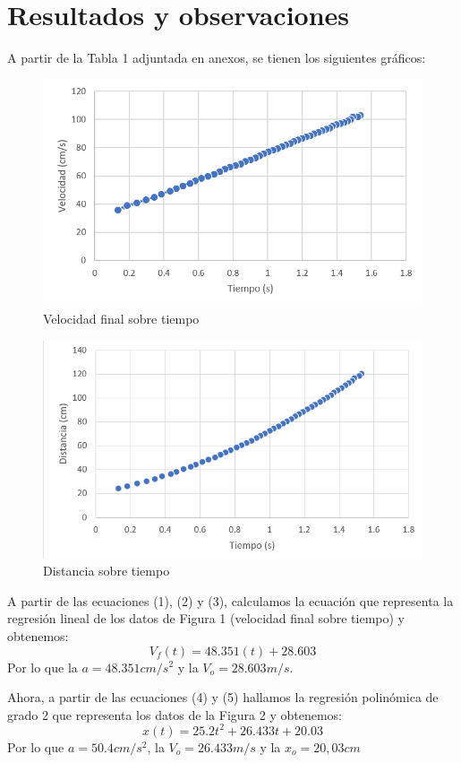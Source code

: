 \documentclass[a4paper]{article}
\begin{document}
\section{Resultados y observaciones}
A partir de la Tabla 1 adjuntada en anexos, se tienen los siguientes gráficos:
\begin{figure} [H]
    \centering
    \includegraphics{Figura_Vf_sobre_t(1).png}
    \caption{Velocidad final sobre tiempo}
    \label{fig:v_t}
\end{figure}
\begin{figure} [H]
    \centering
    \includegraphics{Figura_x_sobre_t(1).png}
    \caption{Distancia sobre tiempo}
    \label{fig:x_t}
\end{figure}

A partir de las ecuaciones (1), (2) y (3), calculamos la ecuación que representa la regresión lineal de los datos de Figura 1 (velocidad final sobre tiempo) y obtenemos:
\[V_f(t) = 48.351(t) + 28.603\]
Por lo que la $a=48.351 cm/s^2$ y la $V_o=28.603m/s$.

Ahora, a partir de las ecuaciones (4) y (5) hallamos la regresión polinómica de grado 2 que representa los datos de la Figura 2 y obtenemos:
\[x(t)=25.2t^2 + 26.433t + 20.03\]
Por lo que $a=50.4 cm/s^2$, la $V_o=26.433 m/s$ y la $x_o=20,03 cm$
\end{document}
